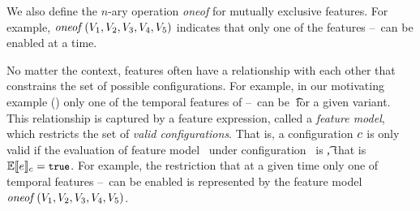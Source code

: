 We also define the $\mathit{n}$-ary operation \emph{oneof} for mutually exclusive features.
For example, \ensuremath{\oneof {\vOne,\vTwo,\vThree,\vFour,\vFive}} indicates that 
only one of the features \vOne--\vFive\ can be enabled at a time.
%


No matter the context, features often have a relationship with each other that
constrains the set of possible configurations. For example, in our motivating example ()
only one of the
temporal features of \vOne--\vFive\ can be \t\ for a given variant. This
relationship is captured by a feature expression, called a \emph{feature model}, 
which restricts the set of \emph{valid configurations}.
That is, a configuration $\config$ is only valid if the evaluation of feature model \dimMeta\
under configuration \config\ is \t, that is $\fSem{\dimMeta}=\t$.
%
For example, the restriction that at a given time only one of temporal features
\vOne--\vFive\ 
can be enabled is represented by the feature model
$\oneof {\vOne, \vTwo, \vThree, \vFour, \vFive}$.


